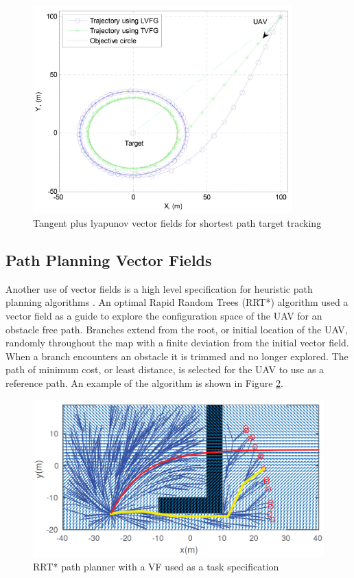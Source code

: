 \documentclass[numbered,pdftex]{ohio-etd}
\begin{document}
\begin{figure}
	\centering
	\includegraphics[width=10cm]{PaperFigures/lyapunovChen}
	\caption{Tangent plus lyapunov vector fields for shortest path target tracking \cite{chen_uav_2013}}
	\label{fig:lyapunovChen}
\end{figure}


\subsection{Path Planning Vector Fields}
Another use of vector fields is a high level specification for heuristic path planning algorithms \cite{pereira_framework_2016}. An optimal Rapid Random Trees (RRT*) algorithm used a vector field as a guide to explore the configuration space of the UAV for an obstacle free path. Branches extend from the root, or initial location of the UAV, randomly throughout the map with a finite deviation from the initial vector field. When a branch encounters an obstacle it is trimmed and no longer explored. The path of minimum cost, or least distance, is selected for the UAV to use as a reference path. An example of the algorithm is shown in Figure \ref{fig:rrtvf}.

\begin{figure}[H]
	\centering
	\includegraphics[width=12cm]{PaperFigures/rrtVF}
	\caption{RRT* path planner with a VF used as a task specification \cite{pereira_framework_2016}}
	\label{fig:rrtvf}
\end{figure}
\end{document}
